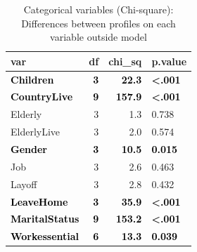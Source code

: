 \documentclass[]{article}
\begin{document}
\begin{table}[H]

\caption{\label{tab:unnamed-chunk-27}Categorical variables (Chi-square): Differences between profiles on each variable outside model}
\centering
\fontsize{6}{8}\selectfont
\begin{tabular}[t]{lrrl}
\toprule
var & df & chi\_sq & p.value\\
\midrule
\textcolor{black}{\textbf{Children}} & \textcolor{black}{\textbf{3}} & \textcolor{black}{\textbf{22.3}} & \textcolor{black}{\textbf{<.001}}\\
\textcolor{black}{\textbf{CountryLive}} & \textcolor{black}{\textbf{9}} & \textcolor{black}{\textbf{157.9}} & \textcolor{black}{\textbf{<.001}}\\
Elderly & 3 & 1.3 & 0.738\\
ElderlyLive & 3 & 2.0 & 0.574\\
\textcolor{black}{\textbf{Gender}} & \textcolor{black}{\textbf{3}} & \textcolor{black}{\textbf{10.5}} & \textcolor{black}{\textbf{0.015}}\\
\addlinespace
Job & 3 & 2.6 & 0.463\\
Layoff & 3 & 2.8 & 0.432\\
\textcolor{black}{\textbf{LeaveHome}} & \textcolor{black}{\textbf{3}} & \textcolor{black}{\textbf{35.9}} & \textcolor{black}{\textbf{<.001}}\\
\textcolor{black}{\textbf{MaritalStatus}} & \textcolor{black}{\textbf{9}} & \textcolor{black}{\textbf{153.2}} & \textcolor{black}{\textbf{<.001}}\\
\textcolor{black}{\textbf{Workessential}} & \textcolor{black}{\textbf{6}} & \textcolor{black}{\textbf{13.3}} & \textcolor{black}{\textbf{0.039}}\\
\bottomrule
\end{tabular}
\end{table}
\end{document}
